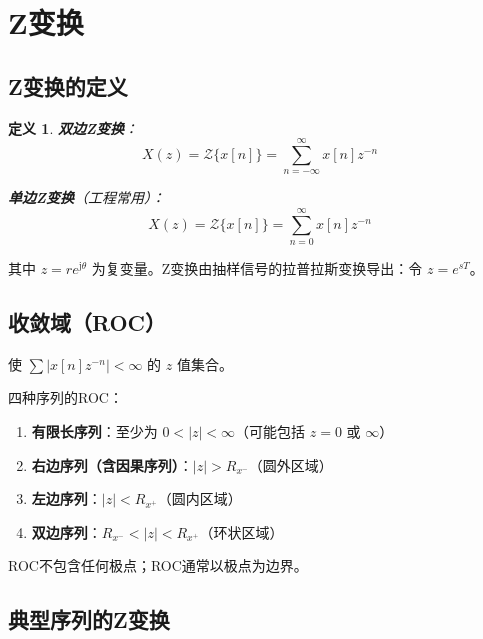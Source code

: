 \documentclass[11pt,a4paper]{ctexart}
\newtheorem{definition}{定义}[section]
\newcommand{\ZT}{\mathcal{Z}}           %
\newcommand{\jj}{\mathrm{j}}            %
\begin{document}
\section{Z变换}

\subsection{Z变换的定义}

\begin{definition}
\textbf{双边Z变换}：
\[
X(z) = \ZT\{x[n]\} = \sum_{n=-\infty}^{\infty} x[n] z^{-n}
\]

\textbf{单边Z变换}（工程常用）：
\[
X(z) = \ZT\{x[n]\} = \sum_{n=0}^{\infty} x[n] z^{-n}
\]
\end{definition}

其中 $z = r e^{\jj\theta}$ 为复变量。Z变换由抽样信号的拉普拉斯变换导出：令 $z = e^{sT}$。

\subsection{收敛域（ROC）}

使 $\sum |x[n]z^{-n}| < \infty$ 的 $z$ 值集合。

四种序列的ROC：
\begin{enumerate}
    \item \textbf{有限长序列}：至少为 $0 < |z| < \infty$（可能包括 $z = 0$ 或 $\infty$）
    \item \textbf{右边序列（含因果序列）}：$|z| > R_{x^-}$（圆外区域）
    \item \textbf{左边序列}：$|z| < R_{x^+}$（圆内区域）
    \item \textbf{双边序列}：$R_{x^-} < |z| < R_{x^+}$（环状区域）
\end{enumerate}

ROC不包含任何极点；ROC通常以极点为边界。

\subsection{典型序列的Z变换}
\end{document}
